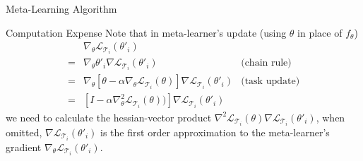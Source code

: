 \documentclass[compress]{beamer}
\begin{document}
\begin{frame}[allowframebreaks]{Meta-Learning Algorithm}
    \begin{block}{Computation Expense}
        Note that in meta-learner's update (using $\theta$ in place of $f_{\theta}$)
        \begin{align*}
             & \nabla_{\theta}\mathcal{L}_{\mathcal{T}_i}(\theta'_i) & \\
            = &  \nabla_{\theta} \theta'_i \nabla \mathcal{L}_{\mathcal{T}_i}(\theta'_i) & \text{(chain rule)} \\
            = & \nabla_{\theta} \left[\theta-\alpha\nabla_{\theta}\mathcal{L}_{\mathcal{T}_i}(\theta)\right] \nabla \mathcal{L}_{\mathcal{T}_i}(\theta'_i)  & \text{(task update)}\\
            = & \left[ I -\alpha\nabla^2_{\theta}\mathcal{L}_{\mathcal{T}_i}(\theta)) \right] \nabla \mathcal{L}_{\mathcal{T}_i}(\theta'_i) &
        \end{align*}
        we need to calculate the hessian-vector product $\nabla^2 \mathcal{L}_{\mathcal{T}_i}(\theta)\nabla \mathcal{L}_{\mathcal{T}_i}(\theta'_i)$, when omitted, $\nabla \mathcal{L}_{\mathcal{T}_i}(\theta'_i)$ is the first order approximation to the meta-learner's gradient $\nabla_{\theta}\mathcal{L}_{\mathcal{T}_i}(\theta'_i)$.
    \end{block}


\end{frame}
\end{document}
